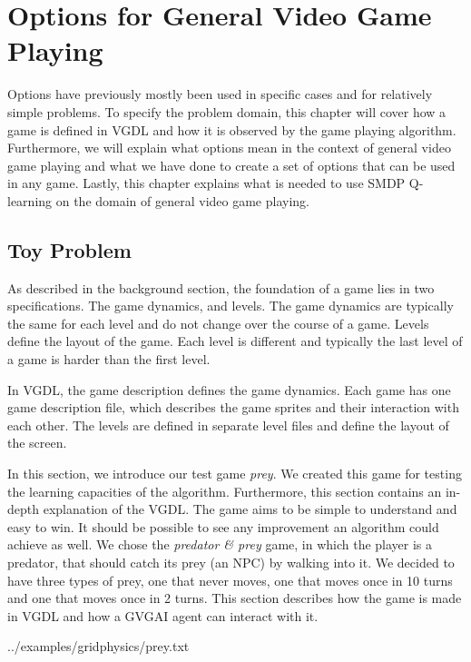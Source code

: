 \chapter{Options for General Video Game Playing}

Options have previously mostly been used in specific cases and for relatively
simple problems. To specify the problem domain, this chapter will cover how a
game is defined in VGDL and how it is observed by the game playing algorithm.
Furthermore, we will explain what options mean in the context of general video
game playing and what we have done to create a set of options that can be used
in any game. Lastly, this chapter explains what is needed to use SMDP Q-learning
on the domain of general video game playing.

\section{Toy Problem}

As described in the background section, the foundation of a game lies in two
specifications. The game dynamics, and levels. The game dynamics are typically
the same for each level and do not change over the course of a game. Levels
define the layout of the game. Each level is different and typically the last
level of a game is harder than the first level.

In VGDL, the game description defines the game dynamics. Each game has one game
description file, which describes the game sprites and their interaction with
each other. The levels are defined in separate level files and define the layout
of the screen.

In this section, we introduce our test game \emph{prey}. We created this game
for testing the learning capacities of the algorithm. Furthermore, this section
contains an in-depth explanation of the VGDL. The game aims to be simple to
understand and easy to win. It should be possible to see any improvement an
algorithm could achieve as well. We chose the \emph{predator \& prey} game, in
which the player is a predator, that should catch its prey (an NPC) by walking
into it. We decided to have three types of prey, one that never moves, one that
moves once in 10 turns and one that moves once in 2 turns. This section
describes how the game is made in VGDL and how a GVGAI agent can interact with
it.

%
{../examples/gridphysics/prey.txt}

